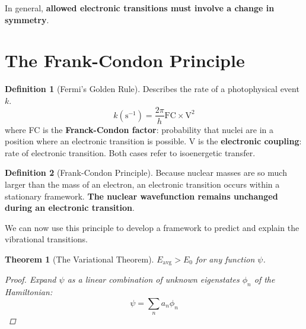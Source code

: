 \documentclass[a4paper]{tufte-handout}
\newtheorem{theorem}{Theorem}
\theoremstyle{definition}
\newtheorem{definition}{Definition}
\begin{document}
In general, \textbf{allowed electronic transitions must involve a change in symmetry}. \cite{atkins2014atkins}

\section{The Frank-Condon Principle}

\begin{definition}[Fermi's Golden Rule] Describes the rate of a photophysical event $k$.
  \begin{equation}
    k(\mathrm{s}^{-1}) = \frac{2\pi}{h} \mathrm{FC} \times \mathrm{V}^2
  \end{equation}
  where FC is the \textbf{Franck-Condon factor}: probability that nuclei are in a position where an electronic transition is possible.
  V is the \textbf{electronic coupling}: rate of electronic transition. Both cases refer to isoenergetic transfer.


\end{definition}

\begin{definition}[Frank-Condon Principle]
  Because nuclear masses are so much larger than the mass of an electron, an electronic transition occurs
  within a stationary framework. \textbf{The nuclear wavefunction remains unchanged during an electronic transition}.
\end{definition}

We can now use this principle to develop a framework to predict and explain the vibrational transitions.

\begin{theorem}[The Variational Theorem] $E_{\mathrm{avg}} > E_0$ for any function $\psi$. 

  \begin{proof}
    Expand $\psi$ as a linear combination of unknown eigenstates $\phi_n$ of the Hamiltonian:
    \begin{equation*}
      \psi = \sum_n a_n \phi_n
    \end{equation*}
  \end{proof}
  
\end{theorem}
\end{document}
